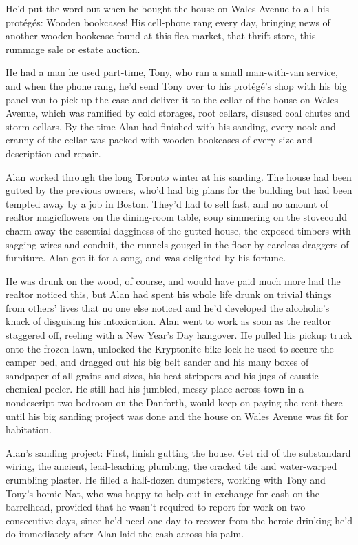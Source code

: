 He'd put the word out when he bought the house on Wales Avenue to all
his prot\'{e}g\'{e}s:  Wooden bookcases!  His cell-phone rang every day,
bringing news of another wooden bookcase found at this flea market,
that thrift store, this rummage sale or estate auction.

He had a man he used part-time, Tony, who ran a small man-with-van
service, and when the phone rang, he'd send Tony over to his
prot\'{e}g\'{e}'s shop with his big panel van to pick up the case and
deliver it to the cellar of the house on Wales Avenue, which was
ramified by cold storages, root cellars, disused coal chutes and storm
cellars.  By the time Alan had finished with his sanding, every nook
and cranny of the cellar was packed with wooden bookcases of every
size and description and repair.

Alan worked through the long Toronto winter at his sanding.  The house
had been gutted by the previous owners, who'd had big plans for the
building but had been tempted away by a job in Boston.  They'd had to
sell fast, and no amount of realtor magic\dash{}flowers on the dining-room
table, soup simmering on the stove\dash{}could charm away the essential
dagginess of the gutted house, the exposed timbers with sagging wires
and conduit, the runnels gouged in the floor by careless draggers of
furniture.  Alan got it for a song, and was delighted by his fortune.

He was drunk on the wood, of course, and would have paid much more had
the realtor noticed this, but Alan had spent his whole life drunk on
trivial things from others' lives that no one else noticed and he'd
developed the alcoholic's knack of disguising his intoxication.  Alan
went to work as soon as the realtor staggered off, reeling with a New
Year's Day hangover.  He pulled his pickup truck onto the frozen lawn,
unlocked the Kryptonite bike lock he used to secure the camper bed,
and dragged out his big belt sander and his many boxes of sandpaper of
all grains and sizes, his heat strippers and his jugs of caustic
chemical peeler.  He still had his jumbled, messy place across town in
a nondescript two-bedroom on the Danforth, would keep on paying the
rent there until his big sanding project was done and the house on
Wales Avenue was fit for habitation.

Alan's sanding project:  First, finish gutting the house.  Get rid of
the substandard wiring, the ancient, lead-leaching plumbing, the
cracked tile and water-warped crumbling plaster.  He filled a
half-dozen dumpsters, working with Tony and Tony's homie Nat, who was
happy to help out in exchange for cash on the barrelhead, provided
that he wasn't required to report for work on two consecutive days,
since he'd need one day to recover from the heroic drinking he'd do
immediately after Alan laid the cash across his palm.

